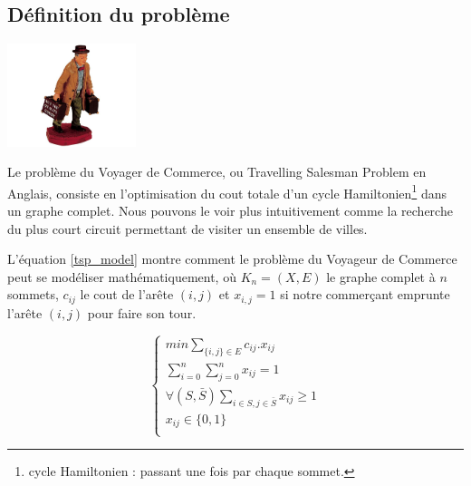 \subsection{Définition du problème}

\begin{minipage}[b]{0.3\linewidth}
\centering
\includegraphics[height=3cm]{../images/salesman2.jpg}
\end{minipage}
\hspace{0.5cm}
\begin{minipage}[b]{0.7\linewidth}
Le problème du Voyager de Commerce, ou \og Travelling Salesman Problem \fg{} en Anglais, consiste en l'optimisation du cout totale d'un cycle Hamiltonien\footnote{cycle Hamiltonien : passant une fois par chaque sommet.} dans un graphe complet. Nous pouvons le voir plus intuitivement comme la recherche du plus court circuit permettant de visiter un ensemble de villes.
\end{minipage}

L'équation \ref{tsp_model} montre comment le problème du Voyageur de Commerce peut se modéliser mathématiquement, où $K_n=(X,E)$ le graphe complet à $n$ sommets, $c_{ij}$ le cout de l'arête $(i,j)$ et $x_{i,j} = 1$ si notre commerçant emprunte l'arête $(i,j)$ pour faire son tour. 

\begin{equation}
\label{tsp_model}
\begin{cases}
min \sum_{\{i, j\} \in E} c_{ij}.x_{ij} \\
\sum_{i=0}^n \sum_{j=0}^n x_{ij} = 1 \\
\forall (S, \bar{S}) \sum_{i \in S, j \in \bar{S}} x_{ij} \geq 1 \\
x_{ij} \in \{0, 1\} \\
\end{cases}
\end{equation}


